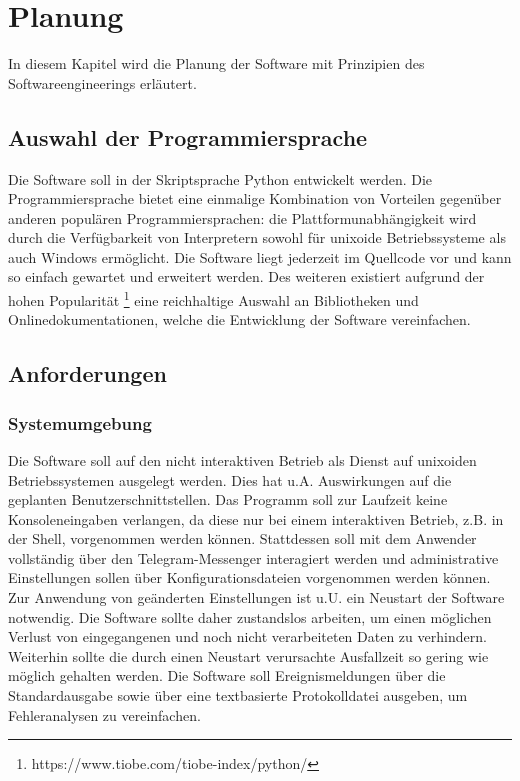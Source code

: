\chapter{Planung}

In diesem Kapitel wird die Planung der Software mit Prinzipien des Softwareengineerings erläutert. 

\section{Auswahl der Programmiersprache}

Die Software soll in der Skriptsprache Python entwickelt werden. Die Programmiersprache bietet eine einmalige Kombination von Vorteilen gegenüber anderen populären Programmiersprachen: die Plattformunabhängigkeit wird durch die Verfügbarkeit von Interpretern sowohl für unixoide Betriebssysteme als auch Windows ermöglicht. Die Software liegt jederzeit im Quellcode vor und kann so einfach gewartet und erweitert werden. Des weiteren existiert aufgrund der hohen Popularität \footnote{https://www.tiobe.com/tiobe-index/python/} eine reichhaltige Auswahl an Bibliotheken und Onlinedokumentationen, welche die Entwicklung der Software vereinfachen. 

\section{Anforderungen}

\subsection{Systemumgebung}

Die Software soll auf den nicht interaktiven Betrieb als Dienst auf unixoiden Betriebssystemen ausgelegt werden. Dies hat u.A. Auswirkungen auf die geplanten Benutzerschnittstellen. Das Programm soll zur Laufzeit keine Konsoleneingaben verlangen, da diese nur bei einem interaktiven Betrieb, z.B. in der Shell, vorgenommen werden können. Stattdessen soll mit dem Anwender vollständig über den Telegram-Messenger interagiert werden und administrative Einstellungen sollen über Konfigurationsdateien vorgenommen werden können. Zur Anwendung von geänderten Einstellungen ist u.U. ein Neustart der Software notwendig. Die Software sollte daher zustandslos arbeiten, um einen möglichen Verlust von eingegangenen und noch nicht verarbeiteten Daten zu verhindern. Weiterhin sollte die durch einen Neustart verursachte Ausfallzeit so gering wie möglich gehalten werden. Die Software soll Ereignismeldungen über die Standardausgabe sowie über eine textbasierte Protokolldatei ausgeben, um Fehleranalysen zu vereinfachen.


